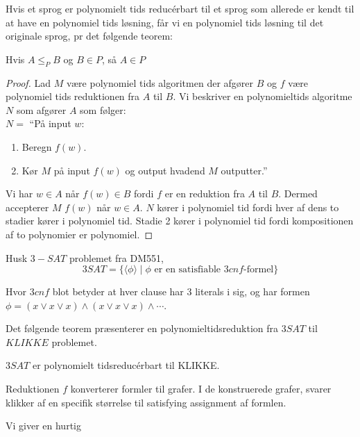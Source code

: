 Hvis et sprog er polynomielt tids reducérbart til et sprog som allerede er kendt til at have en polynomiel tids løsning, får vi en polynomiel tids løsning til det originale sprog, pr det følgende teorem:

\begin{theorem}
Hvis $A \le_{P} B$ og $B \in P$, så $A \in P$
\end{theorem}

\begin{proof}
  Lad $M$ være polynomiel tids algoritmen der afgører $B$ og $f$ være polynomiel tids reduktionen fra $A$ til $B$. Vi beskriver en polynomieltids algoritme $N$ som afgører $A$ som følger:\\
  \noindent
  $N = $ ``På input $w$:
  \begin{enumerate}
    \item Beregn $f(w)$.
    \item Kør $M$ på input $f(w)$ og output hvadend $M$ outputter.''
  \end{enumerate}

Vi har $w \in A$ når $f(w) \in B$ fordi $f$ er en reduktion fra $A$ til $B$. Dermed accepterer $M$ $f(w)$ når $w \in A$. $N$ kører i polynomiel tid fordi hver af dens to stadier kører i polynomiel tid. Stadie 2 kører i polynomiel tid fordi kompositionen af to polynomier er polynomiel.
\end{proof}

Husk $3-SAT$ problemet fra DM551,
\begin{equation*}
  3SAT = \{ \langle \phi \rangle \mid \phi \text{ er en satisfiable }3cnf\text{-formel}\}
\end{equation*}

Hvor $3cnf$ blot betyder at hver clause har 3 literals i sig, og har formen $\phi = (x \lor x \lor x) \land (x \lor x \lor x) \land \cdots$.

Det følgende teorem præsenterer en polynomieltidsreduktion fra $3SAT$ til $KLIKKE$ problemet.

\begin{theorem}
$3SAT$ er polynomielt tidsreducérbart til KLIKKE.
\end{theorem}

Reduktionen $f$ konverterer formler til grafer. I de konstruerede grafer, svarer klikker af en specifik størrelse til satisfying assignment af formlen.

Vi giver en hurtig

